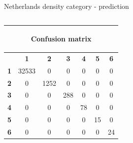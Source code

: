 \documentclass[c]{beamer}
\begin{document}
\begin{frame}
\begin{columns}
\begin{column}{0.5\textwidth}
\begin{overlayarea}{\linewidth}{4cm}
  \end{overlayarea}
  \begin{overlayarea}{\linewidth}{0.5cm}
    \centering
    \tiny Netherlands density category - prediction\par
  \end{overlayarea}
 \end{column}
\end{columns}
\begin{columns}
 \begin{column}{0.5\textwidth}
 \begin{overlayarea}{\linewidth}{2cm}
  \begin{table}
  \begin{center}
  \begin{adjustbox}{max width=0.7\textwidth}
  {\tiny
  \begin{tabular}{|c|c|c|c|c|c|c|}
    \hline
    \multicolumn{7}{|c|}{{\tiny \begin{bf}Confusion matrix\end{bf}}} \\
    \hline
     & \textbf{1} & \textbf{2} & \textbf{3} & \textbf{4} & \textbf{5} & \textbf{6}\\
    \hline
    \textbf{1} & 32533 & 0 & 0 & 0 & 0 & 0\\
    \hline
    \textbf{2} & 0 & 1252 & 0 & 0 & 0 & 0\\
    \hline
    \textbf{3} & 0 & 0 & 288 & 0 & 0 & 0\\
    \hline
    \textbf{4} & 0 & 0 & 0 & 78 & 0 & 0\\
    \hline
    \textbf{5} & 0 & 0 & 0 & 0 & 15 & 0\\
    \hline
    \textbf{6} & 0 & 0 & 0 & 0 & 0 & 24\\
    \hline
  \end{tabular}
  }
  \end{adjustbox}
  \end{center}
  \end{table}
 \end{overlayarea}
 \end{column}
 \begin{column}{0.5\textwidth}
 \begin{overlayarea}{\linewidth}{2cm}
  \begin{table}
    \begin{center}
    \begin{adjustbox}{max width=0.4\textwidth}
    {\tiny 
    \begin{tabular}{|c|c|}
      \hline

\end{tabular}}
\end{adjustbox}
\end{center}
\end{table}
\end{overlayarea}
\end{column}
\end{columns}
\end{frame}
\end{document}
